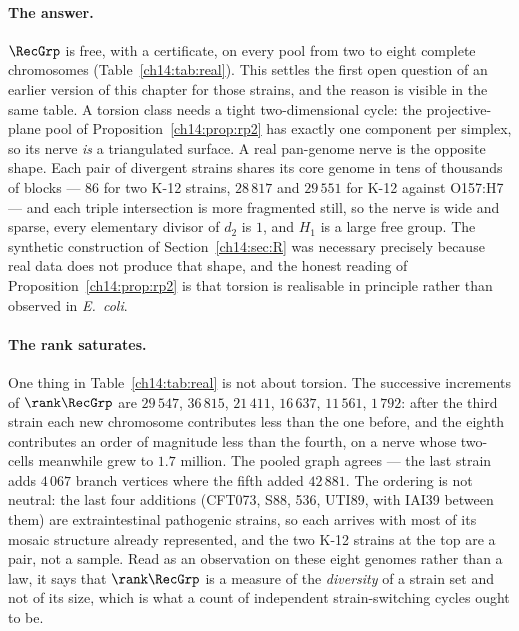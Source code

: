 \paragraph{The answer.} $\RecGrp$ is free, with a certificate, on every pool from two to eight
complete chromosomes (Table~\ref{ch14:tab:real}). This settles the first open question of an
earlier version of this chapter for those strains, and the reason is visible in the same table. A
torsion class needs a tight two-dimensional cycle: the projective-plane pool of
Proposition~\ref{ch14:prop:rp2} has exactly one component per simplex, so its nerve \emph{is} a
triangulated surface. A real pan-genome nerve is the opposite shape. Each pair of divergent
strains shares its core genome in tens of thousands of blocks --- $86$ for two K-12 strains,
$28\,817$ and $29\,551$ for K-12 against O157:H7 --- and each triple intersection is more
fragmented still, so the nerve is wide and sparse, every elementary divisor of $d_2$ is $1$,
and $H_1$ is a large free group. The synthetic construction of
Section~\ref{ch14:sec:R} was necessary precisely because real data does not produce that shape,
and the honest reading of Proposition~\ref{ch14:prop:rp2} is that torsion is realisable in
principle rather than observed in \emph{E.\ coli}.

\paragraph{The rank saturates.} One thing in Table~\ref{ch14:tab:real} is not about torsion. The
successive increments of $\rank\RecGrp$ are $29\,547$, $36\,815$, $21\,411$, $16\,637$,
$11\,561$, $1\,792$: after the third strain each new chromosome contributes less than the
one before, and the eighth contributes an order of magnitude less than the fourth, on a
nerve whose two-cells meanwhile grew to $1.7$ million. The pooled graph agrees --- the last
strain adds $4\,067$ branch vertices where the fifth added $42\,881$. The ordering is not
neutral: the last four additions (CFT073, S88, 536, UTI89, with IAI39 between them) are
extraintestinal pathogenic strains, so each arrives with most of its mosaic structure
already represented, and the two K-12 strains at the top are a pair, not a sample. Read as
an observation on these eight genomes rather than a law, it says that $\rank\RecGrp$ is a
measure of the \emph{diversity} of a strain set and not of its size, which is what a count
of independent strain-switching cycles ought to be.

